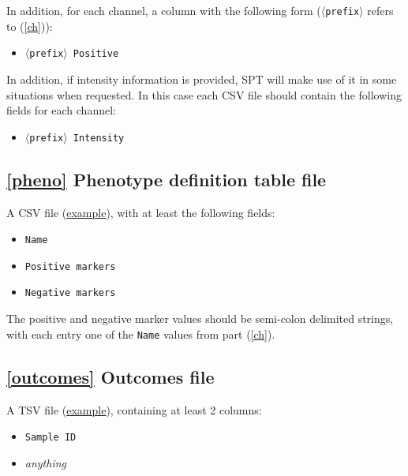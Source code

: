 \documentclass[14pt]{article}
\begin{document}
In addition, for each channel, a column with the following form (\colorbox{yellow!25}{\texttt{$\langle$prefix$\rangle$}} refers to (\ref{ch})):

\begin{itemize}
  \itemsep0em
  \item[]{\colorbox{yellow!25}{\texttt{$\langle$prefix$\rangle$ Positive}}}
\end{itemize}


In addition, if intensity information is provided, SPT will make use of it in some situations when requested. In this case each CSV file should contain the following fields for each channel:

\begin{itemize}
  \itemsep0em
  \item[]{\colorbox{yellow!25}{\texttt{$\langle$prefix$\rangle$ Intensity}}}
\end{itemize}

\subsection*{\ref{pheno} Phenotype definition table file} A CSV file (\href{https://github.com/nadeemlab/SPT/blob/main/tests/data/complex_phenotypes.csv}{example}), with at least the following fields:

\begin{itemize}
  \itemsep0em
  \item[]{\colorbox{yellow!25}{\texttt{Name}}}
  \item[]{\colorbox{yellow!25}{\texttt{Positive markers}}}
  \item[]{\colorbox{yellow!25}{\texttt{Negative markers}}}
\end{itemize}

The positive and negative marker values should be semi-colon delimited strings, with each entry one of the \colorbox{yellow!25}{\texttt{Name}} values from part (\ref{ch}).

\subsection*{\ref{outcomes} Outcomes file} A TSV file (\href{https://github.com/nadeemlab/SPT/blob/main/tests/data/diagnosis.tsv}{example}), containing at least 2 columns:

\begin{itemize}
  \itemsep0em
  \item[]{\colorbox{yellow!25}{\texttt{Sample ID}}}
  \item[]{\colorbox{yellow!25}{\emph{anything}}}
\end{itemize}
\end{document}
